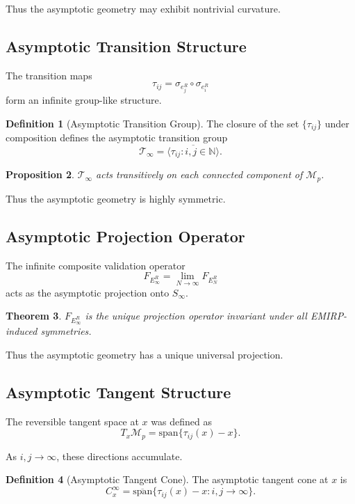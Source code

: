 \documentclass[11pt]{article}
\theoremstyle{definition}
\newtheorem{definition}{Definition}[section]
\theoremstyle{plain}
\newtheorem{theorem}[definition]{Theorem}
\newtheorem{proposition}[definition]{Proposition}
\theoremstyle{remark}
\begin{document}
Thus the asymptotic geometry may exhibit nontrivial curvature.

\subsection{Asymptotic Transition Structure}

The transition maps
\[
\tau_{ij} = \sigma_{e_j^R} \circ \sigma_{e_i^R}
\]
form an infinite group-like structure.

\begin{definition}[Asymptotic Transition Group]
The closure of the set $\{\tau_{ij}\}$ under composition defines the
asymptotic transition group
\[
\mathcal{T}_\infty = \overline{\langle \tau_{ij} : i,j \in \mathbb{N} \rangle}.
\]
\end{definition}

\begin{proposition}
$\mathcal{T}_\infty$ acts transitively on each connected component of
$\mathcal{M}_p$.
\end{proposition}

Thus the asymptotic geometry is highly symmetric.

\subsection{Asymptotic Projection Operator}

The infinite composite validation operator
\[
F_{E_\infty^R} = \lim_{N \to \infty} F_{E_N^R}
\]
acts as the asymptotic projection onto $S_\infty$.

\begin{theorem}
$F_{E_\infty^R}$ is the unique projection operator invariant under all
EMIRP-induced symmetries.
\end{theorem}

Thus the asymptotic geometry has a unique universal projection.

\subsection{Asymptotic Tangent Structure}

The reversible tangent space at $x$ was defined as
\[
T_x \mathcal{M}_p = \mathrm{span}\{\tau_{ij}(x) - x\}.
\]

As $i,j \to \infty$, these directions accumulate.

\begin{definition}[Asymptotic Tangent Cone]
The asymptotic tangent cone at $x$ is
\[
C_x^\infty = \overline{\mathrm{span}}\{\tau_{ij}(x) - x : i,j \to \infty\}.
\]
\end{definition}
\end{document}
